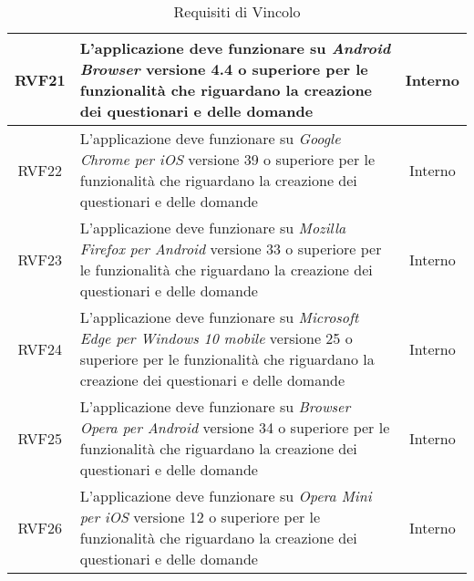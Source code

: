\begin{longtable}{|c|>{\centering}m{7cm}|c|}
		\\ \hline
		\hypertarget{RVF21}{RVF21} & L’applicazione deve funzionare su \textit{Android Browser\ped{G}} versione 4.4 o superiore per le funzionalità che riguardano la creazione dei questionari e delle domande & Interno
		\\ \hline
		\hypertarget{RVF22}{RVF22} & L’applicazione deve funzionare su \textit{Google Chrome per iOS\ped{G}} versione 39 o superiore per le funzionalità che riguardano la creazione dei questionari e delle domande & Interno
		\\ \hline
		\hypertarget{RVF23}{RVF23} & L’applicazione deve funzionare su \textit{Mozilla Firefox per Android\ped{G}} versione 33 o superiore per le funzionalità che riguardano la creazione dei questionari e delle domande & Interno
		\\ \hline
		\hypertarget{RVF24}{RVF24} & L’applicazione deve funzionare su \textit{Microsoft Edge per Windows 10 mobile\ped{G}} versione 25 o superiore per le funzionalità che riguardano la creazione dei questionari e delle domande & Interno
		\\ \hline
		\hypertarget{RVF25}{RVF25} & L’applicazione deve funzionare su \textit{Browser Opera per Android\ped{G}} versione 34 o superiore per le funzionalità che riguardano la creazione dei questionari e delle domande & Interno
		\\ \hline
		\hypertarget{RVF26}{RVF26} & L’applicazione deve funzionare su \textit{Opera Mini per iOS\ped{G}} versione 12 o superiore per le funzionalità che riguardano la creazione dei questionari e delle domande & Interno
\caption[Requisiti di Vincolo]{Requisiti di Vincolo}
\label{tabella:req3}
\end{longtable}
\clearpage
